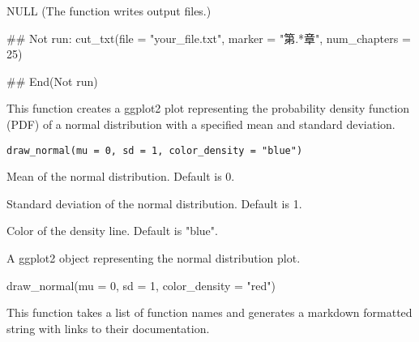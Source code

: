 \documentclass[a4paper]{book}
\begin{document}
%
\begin{Value}
NULL (The function writes output files.)
\end{Value}
%
\begin{Examples}
\begin{ExampleCode}
## Not run: 
cut_txt(file = "your_file.txt", marker = "第.*章", num_chapters = 25)

## End(Not run)

\end{ExampleCode}
\end{Examples}
%
\begin{Description}
This function creates a ggplot2 plot representing the probability density function (PDF)
of a normal distribution with a specified mean and standard deviation.
\end{Description}
%
\begin{Usage}
\begin{verbatim}
draw_normal(mu = 0, sd = 1, color_density = "blue")
\end{verbatim}
\end{Usage}
%
\begin{Arguments}
\begin{ldescription}
\item[\code{mu}] Mean of the normal distribution. Default is 0.

\item[\code{sd}] Standard deviation of the normal distribution. Default is 1.

\item[\code{color\_density}] Color of the density line. Default is "blue".
\end{ldescription}
\end{Arguments}
%
\begin{Value}
A ggplot2 object representing the normal distribution plot.
\end{Value}
%
\begin{Examples}
\begin{ExampleCode}
draw_normal(mu = 0, sd = 1, color_density = "red")

\end{ExampleCode}
\end{Examples}
%
\begin{Description}
This function takes a list of function names and generates a markdown
formatted string with links to their documentation.
\end{Description}
\end{document}
